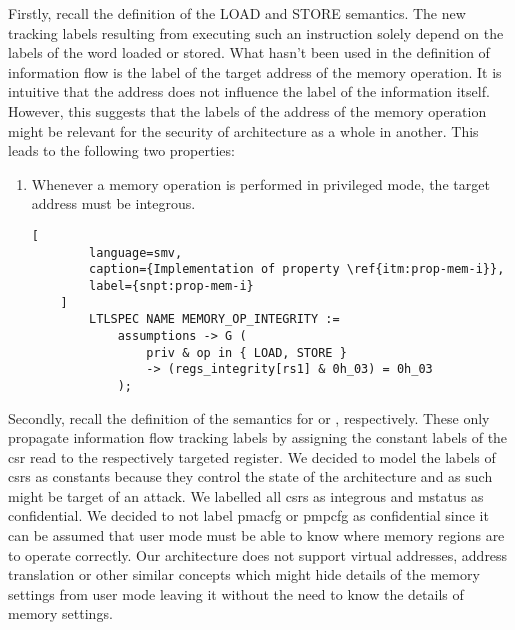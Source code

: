 Firstly, recall the definition of the LOAD and STORE semantics.
The new tracking labels resulting from executing such an instruction solely depend on the labels of the word loaded or stored.
What hasn't been used in the definition of information flow is the label of the target address of the memory operation.
It is intuitive that the address does not influence the label of the information itself.
However, this suggests that the labels of the address of the memory operation might be relevant for the security of architecture as a whole in another.
This leads to the following two properties:
\begin{enumerate}[label=\Roman*.,series=]
    \item \label{itm:prop-mem-i}
    Whenever a memory operation is performed in privileged mode, the target address must be integrous.

    \begin{lstlisting}[
        language=smv,
        caption={Implementation of property \ref{itm:prop-mem-i}},
        label={snpt:prop-mem-i}
    ]
        LTLSPEC NAME MEMORY_OP_INTEGRITY :=
            assumptions -> G (
                priv & op in { LOAD, STORE }
                -> (regs_integrity[rs1] & 0h_03) = 0h_03
            );
    \end{lstlisting}
\end{enumerate}


Secondly, recall the definition of the semantics for  or , respectively.
These only propagate information flow tracking labels by assigning the constant labels of the \gls{csr} read to the respectively targeted register.
We decided to model the labels of \glspl{csr} as constants because they control the state of the architecture and as such might be target of an attack.
We labelled all \glspl{csr} as integrous and \gls{mstatus} as confidential.
We decided to not label \gls{pmacfg} or \gls{pmpcfg} as confidential since it can be assumed that user mode must be able to know where memory regions are to operate correctly.
Our architecture does not support virtual addresses, address translation or other similar concepts which might hide details of the memory settings from user mode leaving it without the need to know the details of memory settings.

